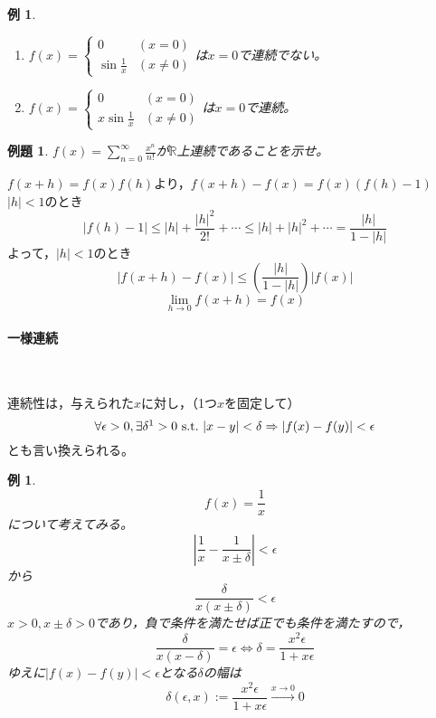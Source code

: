 \documentclass[dvipdfmx,a4j,10pt]{jsarticle}
\makeatletter
\theoremstyle{mystyle1}
\newtheorem{ex}[dfn]{例題}
\newtheorem{example}[dfn]{例}
\theoremstyle{mystyle2}
\newtheorem{ans}{解答}
\renewenvironment{ans}[1][解答]{\par
  \pushQED{\qed}%
  \normalfont
  \topsep6\p@\@plus6\p@ \trivlist
  \item[\hskip\labelsep{\bfseries\sffamily #1}]\ignorespaces
}{%
  \popQED\endtrivlist\@endpefalse
}
\makeatother
\begin{document}
\begin{example}\
    \begin{enumerate}
    \item $ f(x) =
    \begin{cases}
    0 & (x = 0)\\
    \displaystyle\sin{\frac{1}{x}} & (x \neq 0)
    \end{cases}
    $は$x=0$で連続でない。
    \item $ f(x) =
    \begin{cases}
    0 & (x = 0)\\
    \displaystyle x\sin{\frac{1}{x}} & (x \neq 0)
    \end{cases}
    $は$x=0$で連続。
    \end{enumerate}
\end{example}

\begin{shaded}
\begin{ex}\label{ex5.4}
$\displaystyle f(x)=\sum_{n=0}^\infty \frac{x^n}{n!}$が$\mathbb{R}$上連続であることを示せ。
\end{ex}
\end{shaded}

\par\noindent
\begin{ans}[解答\ref{ex5.4}]
    $f(x+h)=f(x)f(h)$より，$f(x+h)-f(x)=f(x)(f(h)-1)$\\
    $|h|<1$のとき
    \[
    |f(h)-1|\leq |h|+\frac{|h|^2}{2!}+\cdots \leq |h|+|h|^2+\cdots =\frac{|h|}{1-|h|}
    \]
    よって，$|h|<1$のとき
    \[
    |f(x+h)-f(x)|\leq\left(\frac{|h|}{1-|h|}\right)|f(x)|
    \]
    \[
    \lim_{h\to0}f(x+h)=f(x)
    \]
\end{ans}

\newpage

\paragraph{一様連続}
　
\begin{framed}
連続性は，与えられた$x$に対し，（1つ$x$を固定して）
\[
\forall\epsilon>0,\exists\delta\footnotemark >0\ {\rm s.t.}\ |x-y|<\delta \Rightarrow |f(x)-f(y)|<\epsilon
\]
とも言い換えられる。
\end{framed}

\begin{example}
    \[
    f(x)=\frac{1}{x}
    \]
    について考えてみる。
    \[
    \left|\frac{1}{x}-\frac{1}{x\pm \delta}\right|<\epsilon
    \]
    から
    \[
     \frac{\delta}{x(x\pm\delta)}<\epsilon
    \]
    $x>0,x\pm\delta >0$であり，負で条件を満たせば正でも条件を満たすので，
    \[\frac{\delta}{x(x-\delta)}=\epsilon \Leftrightarrow \delta=\frac{x^2\epsilon}{1+x\epsilon}\]
    ゆえに$|f(x)-f(y)|<\epsilon$となる$\delta$の幅は
    \[
    \delta(\epsilon,x):=\frac{x^2\epsilon}{1+x\epsilon} \overset{x\to0}{\longrightarrow} 0
    \]
\end{example}
\end{document}
